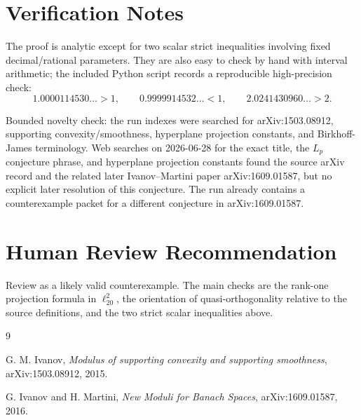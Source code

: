 \documentclass[11pt]{article}
\begin{document}
\section*{Verification Notes}

The proof is analytic except for two scalar strict inequalities involving
fixed decimal/rational parameters. They are also easy to check by hand with
interval arithmetic; the included Python script records a reproducible
high-precision check:
\[
1.0000114530\ldots>1,\qquad
0.9999914532\ldots<1,\qquad
2.0241430960\ldots>2.
\]

Bounded novelty check: the run indexes were searched for arXiv:1503.08912,
supporting convexity/smoothness, hyperplane projection constants, and
Birkhoff-James terminology. Web searches on 2026-06-28 for the exact title,
the \(L_p\) conjecture phrase, and hyperplane projection constants found the
source arXiv record and the related later Ivanov--Martini paper
arXiv:1609.01587, but no explicit later resolution of this conjecture.
The run already contains a counterexample packet for a different conjecture in
arXiv:1609.01587.

\section*{Human Review Recommendation}

Review as a likely valid counterexample. The main checks are the rank-one
projection formula in \(\ell_{20}^{2}\), the orientation of
quasi-orthogonality relative to the source definitions, and the two strict
scalar inequalities above.

\begin{thebibliography}{9}

G. M. Ivanov,
\emph{Modulus of supporting convexity and supporting smoothness},
arXiv:1503.08912, 2015.

G. Ivanov and H. Martini,
\emph{New Moduli for Banach Spaces},
arXiv:1609.01587, 2016.

\end{thebibliography}
\end{document}
